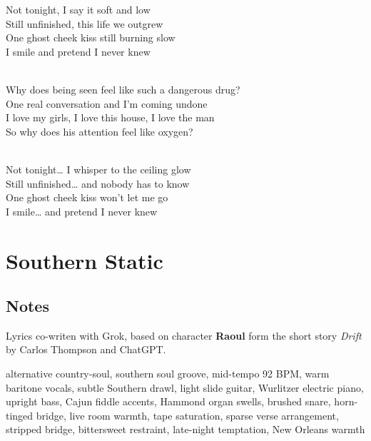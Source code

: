 \begin{lyrics}
Not tonight, I say it soft and low\\
Still unfinished, this life we outgrew\\
One ghost cheek kiss still burning slow\\
I smile and pretend I never knew

\\
Why does being seen feel like such a dangerous drug?\\
One real conversation and I’m coming undone\\
I love my girls, I love this house, I love the man\\
So why does his attention feel like oxygen?

\\
Not tonight… I whisper to the ceiling glow\\
Still unfinished… and nobody has to know\\
One ghost cheek kiss won’t let me go\\
I smile… and pretend I never knew

\end{lyrics}

\section{Southern Static}

\subsection{Notes}
Lyrics co-writen with Grok, based on character \textbf{Raoul} form the short story \emph{Drift} by Carlos Thompson and ChatGPT.

alternative country-soul, southern soul groove, mid-tempo 92 BPM, warm baritone vocals, subtle Southern drawl, light slide guitar, Wurlitzer electric piano, upright bass, Cajun fiddle accents, Hammond organ swells, brushed snare, horn-tinged bridge, live room warmth, tape saturation, sparse verse arrangement, stripped bridge, bittersweet restraint, late-night temptation, New Orleans warmth

